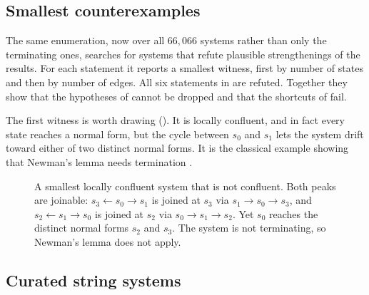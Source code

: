 

\subsection{Smallest counterexamples}
\label{subsec:boundary-search}

The same enumeration, now over all $66{,}066$ systems rather than only the terminating ones, searches for systems that refute plausible strengthenings of the results. For each statement it reports a smallest witness, first by number of states and then by number of edges. All six statements in  are refuted. Together they show that the hypotheses of  cannot be dropped and that the shortcuts of  fail.



The first witness is worth drawing (). It is locally confluent, and in fact every state reaches a normal form, but the cycle between $s_0$ and $s_1$ lets the system drift toward either of two distinct normal forms. It is the classical example showing that Newman's lemma needs termination \cite{Huet1980,BaaderNipkow1998}.

\begin{figure}[t]
\centering
{}
\caption{A smallest locally confluent system that is not confluent. Both peaks are joinable: $s_3 \leftarrow s_0 \to s_1$ is joined at $s_3$ via $s_1 \to s_0 \to s_3$, and $s_2 \leftarrow s_1 \to s_0$ is joined at $s_2$ via $s_0 \to s_1 \to s_2$. Yet $s_0$ reaches the distinct normal forms $s_2$ and $s_3$. The system is not terminating, so Newman's lemma does not apply.}
\label{fig:newman-needs-termination}
\end{figure}

\subsection{Curated string systems}
\label{subsec:curated-string-systems}

